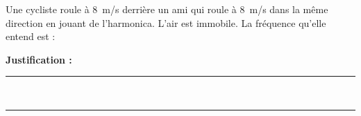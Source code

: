 Une cycliste roule à \qty{8}{m/s} derrière un ami qui roule à \qty{8}{m/s} dans la même direction en jouant de l'harmonica. L'air est immobile. La fréquence qu'elle entend est :

\choices

\noindent\textbf{Justification :} \hrulefill \\[2.5ex]
\rule{\linewidth}{0.4pt} \\[2.5ex]
\rule{\linewidth}{0.4pt}
\vfill
